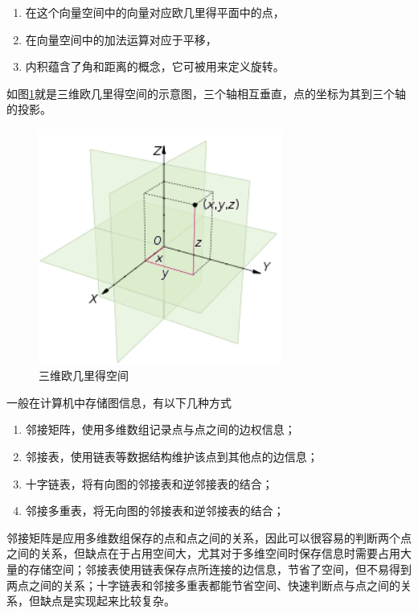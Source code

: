 \begin{enumerate}[.]
    \item 在这个向量空间中的向量对应欧几里得平面中的点，
    \item 在向量空间中的加法运算对应于平移，
    \item 内积蕴含了角和距离的概念，它可被用来定义旋转。
\end{enumerate}\par
如图\ref{fig:3axis}就是三维欧几里得空间的示意图，三个轴相互垂直，点的坐标为其到三个轴的投影。
\begin{figure}[!htb]
  \centering
  \includegraphics[width=8cm]{figures/3axis.png}
  \caption{三维欧几里得空间}  
  \label{fig:3axis}
\end{figure}
\par 一般在计算机中存储图信息，有以下几种方式
\begin{enumerate}
    \item 邻接矩阵，使用多维数组记录点与点之间的边权信息；
    \item 邻接表，使用链表等数据结构维护该点到其他点的边信息；
    \item 十字链表，将有向图的邻接表和逆邻接表的结合；
    \item 邻接多重表，将无向图的邻接表和逆邻接表的结合；
\end{enumerate}\par
邻接矩阵是应用多维数组保存的点和点之间的关系，因此可以很容易的判断两个点之间的关系，但缺点在于占用空间大，尤其对于多维空间时保存信息时需要占用大量的存储空间；邻接表使用链表保存点所连接的边信息，节省了空间，但不易得到两点之间的关系；十字链表和邻接多重表都能节省空间、快速判断点与点之间的关系，但缺点是实现起来比较复杂。

